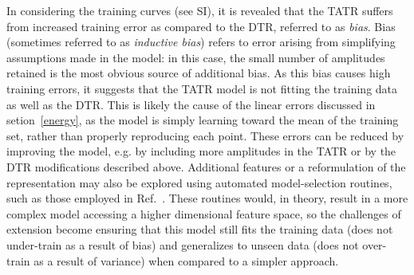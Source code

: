In considering the training curves (see SI), it is revealed that the TATR suffers from increased training error as compared to the DTR, referred to as \textit{bias}. 
Bias (sometimes referred to as \textit{inductive bias})\cite{Rasmussen2006} refers to error arising from simplifying assumptions made in the model: in this case, the small number of amplitudes retained is the most obvious source of additional bias. 
As this bias causes high training errors, it suggests that the TATR model is not fitting the training data as well as the DTR. This is likely the cause of the linear errors discussed in setion~\ref{energy}, as the model is simply learning toward the mean of the training set, rather than properly reproducing each point. 
These errors can be reduced by improving the model, e.g. by including more amplitudes in the TATR or by the DTR modifications described above.
Additional features or a reformulation of the representation may also be explored using automated model-selection routines, such as those employed in Ref.~. These routines would, in theory, result in a more complex model accessing a higher dimensional feature space, so the challenges of extension become ensuring that this model still fits the training data (does not under-train as a result of bias) and generalizes to unseen data (does not over-train as a result of variance) when compared to a simpler approach.

